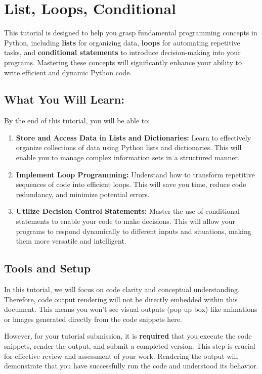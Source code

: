 
\section{List, Loops, Conditional}



This tutorial is designed to help you grasp fundamental programming concepts in Python, including \textbf{lists} for organizing data, \textbf{loops} for automating repetitive tasks, and \textbf{conditional statements} to introduce decision-making into your programs. Mastering these concepts will significantly enhance your ability to write efficient and dynamic Python code.

\subsection{What You Will Learn:}

By the end of this tutorial, you will be able to:

\begin{enumerate}
\item \textbf{Store and Access Data in Lists and Dictionaries:} Learn to effectively organize collections of data using Python lists and dictionaries. This will enable you to manage complex information sets in a structured manner.
\item \textbf{Implement Loop Programming:} Understand how to transform repetitive sequences of code into efficient loops. This will save you time, reduce code redundancy, and minimize potential errors.
\item \textbf{Utilize Decision Control Statements:} Master the use of conditional statements to enable your code to make decisions. This will allow your programs to respond dynamically to different inputs and situations, making them more versatile and intelligent.
\end{enumerate}

\subsection{Tools and Setup}

In this tutorial, we will focus on code clarity and conceptual understanding. Therefore, code output rendering will not be directly embedded within this document. This means you won't see visual outputs (pop up box) like animations or images generated directly from the code snippets here.

However, for your tutorial submission, it is \textbf{required} that you execute the code snippets, render the output, and submit a completed version. This step is crucial for effective review and assessment of your work. Rendering the output will demonstrate that you have successfully run the code and understood its behavior.




